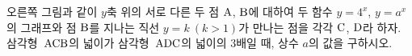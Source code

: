 \noindent\begin{minipage}[t]{0.58\linewidth}\vspace{0pt}\raggedright 오른쪽 그림과 같이 $y$축 위의 서로 다른 두 점 $\mathrm{A}$, $\mathrm{B}$에 대하여 두 함수 $y=4^{x}$, $y=a^{x}$의 그래프와 점 $\mathrm{B}$를 지나는 직선 $y=k\ (k>1)$가 만나는 점을 각각 $\mathrm{C}$, $\mathrm{D}$라 하자. 삼각형~$\mathrm{ACB}$의 넓이가 삼각형~$\mathrm{ADC}$의 넓이의 $3$배일 때, 상수 $a$의 값을 구하시오. \end{minipage}\hfill\begin{minipage}[t]{0.4\linewidth}\vspace{0pt}\centering \resizebox{\ifdim\width>\linewidth\linewidth\else\width\fi}{!}{}\end{minipage}\par
